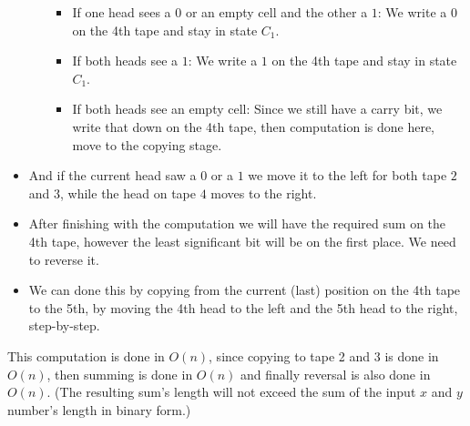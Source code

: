 \begin{itemize}
\begin{itemize}
\begin{itemize}
            \item If one head sees a $0$ or an empty cell and the other a $1$: We write a $0$ on the 4th tape and stay in state $C_1$.
            \item If both heads see a $1$: We write a $1$ on the 4th tape and stay in state $C_1$.
            \item If both heads see an empty cell: Since we still have a carry bit, we write that down on the 4th tape, then computation is done here, move to the copying stage.
        \end{itemize}
    \end{itemize}
    \item And if the current head saw a $0$ or a $1$ we move it to the left for both tape $2$ and $3$, while the head on tape $4$ moves to the right.
    \item After finishing with the computation we will have the required sum on the 4th tape, however the least significant bit will be on the first place. We need to reverse it.
    \item We can done this by copying from the current (last) position on the 4th tape to the 5th, by moving the 4th head to the left and the 5th head to the right, step-by-step.
\end{itemize}

This computation is done in $O(n)$, since copying to tape 2 and 3 is done in $O(n)$, then summing is done in $O(n)$ and finally reversal is also done in $O(n)$. (The resulting sum's length will not exceed the sum of the input $x$ and $y$ number's length in binary form.)